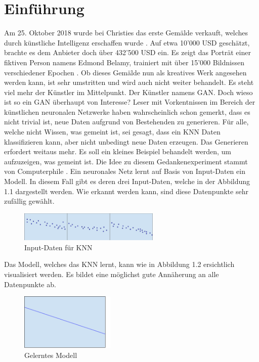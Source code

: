\chapter{Einführung}
Am 25. Oktober 2018 wurde bei Christies das erste Gemälde verkauft, welches durch künstliche Intelligenz erschaffen
wurde \cite{Christies:PortraitEdmundBelamy}. Auf etwa 10'000 USD geschätzt, brachte es dem Anbieter doch über
432'500 USD ein. Es zeigt das Porträt einer fiktiven  Person namens Edmond Belamy,
trainiert mit über 15'000 Bildnissen verschiedener Epochen \cite{nzz:1:belamy}. Ob dieses \glqq Gemälde\grqq{} nun
als kreatives Werk angesehen werden kann, ist sehr umstritten und wird auch nicht weiter behandelt.
Es steht viel mehr der Künstler im Mittelpunkt. Der Künstler namens \Gls{GAN}.
\para
Doch wieso ist so ein \Gls{GAN} überhaupt von Interesse? Leser mit Vorkentnissen im Bereich der künstlichen neuronalen
Netzwerke haben wahrscheinlich schon gemerkt, dass es nicht trivial ist, neue Daten aufgrund von Bestehenden zu generieren.
Für alle, welche nicht Wissen, was gemeint ist, sei gesagt, dass ein \Gls{KNN} Daten klassifizieren kann, aber nicht unbedingt
neue Daten erzeugen. Das Generieren erfordert weitaus mehr.
Es soll ein kleines Beispiel behandelt werden, um aufzuzeigen, was gemeint ist. Die Idee zu diesem Gedankenexperiment
stammt von \glqq Computerphile\grqq{} \cite{youtube:gan}.
Ein neuronales Netz lernt auf Basis von Input-Daten ein Modell. In diesem Fall gibt es deren drei Input-Daten, welche in der Abbildung 1.1
dargestellt werden. Wie erkannt werden kann, sind diese Datenpunkte sehr zufällig gewählt.
\begin{figure}[h!]
    \begin{center}
        \includegraphics[width=0.6\textwidth]{../common/02_main/resources/00_input.png}
    \end{center}
    \caption{Input-Daten für \Gls{KNN}}
    \label{fig:Input-Daten für KNN}
\end{figure}
\newpage
Das Modell, welches das \Gls{KNN} lernt, kann wie in Abbildung 1.2 ersichtlich visualisiert werden. Es bildet eine möglichst
gute Annäherung an alle Datenpunkte ab.
\begin{figure}[h!]
    \begin{center}
        \includegraphics[width=0.4\textwidth]{../common/02_main/resources/01_modell.png}
    \end{center}
    \caption{Gelerntes Modell}
    \label{fig:Gelerntes Modell}
\end{figure}
